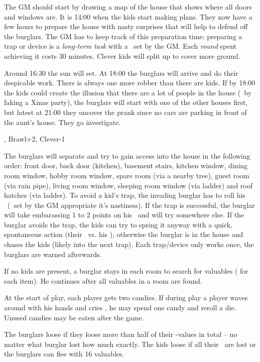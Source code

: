 {	

		\noindent
		The GM should start by drawing a map of the house that shows where all doors and windows are. It is 14:00 when the kids start making plans. They now have a few hours to prepare the house with nasty surprises that will help to defend off the burglars. The GM has to keep track of this preparation time: preparing a trap or device is a \emph{long-term task} with a \TN~set by the GM. Each \emph{round} spent achieving it costs 30 minutes. Clever kids will split up to cover more ground.

		Around 16:30 the sun will set. At 18:00 the burglars will arrive and do their despicable work. There is always one more robber than there are kids. If by 18:00 the kids could create the illusion that there are a lot of people in the house (\eg~by faking a Xmas party), the burglars will start with one of the other houses first, but latest at 21:00 they uncover the prank since no cars are parking in front of the aunt's house. They go investigate.

		, Brawl+2, Clever-1

		The burglars will separate and try to gain access into the house in the following order: front door, back door (kitchen), basement stairs, kitchen window, dining room window, hobby room window, spare room (via a nearby tree), guest room (via rain pipe), living room window, sleeping room window (via ladder) and roof hatches (via ladder). To avoid a kid's trap, the invading burglar has to roll his \RD\ (\TN~set by the GM appropriate it's nastiness). If the trap is successful, the burglar will take embarassing 1 to 2 points on his \HD\ and will try somewhere else. If the burglar avoids the trap, the kids can try to spring it anyway with a quick, spontaneous action (their \AD\ vs. his \RD), otherwise the burglar is in the house and chases the kids (likely into the next trap). Each trap/device only works once, the burglars are warned afterwards.

		If no kids are present, a burglar stays in each room to search for valuables ( for each item). He continues after all valuables in a room are found.


		\noindent
		At the start of play, each player gets two candies. If during play a player waves around with his hands and cries , he may spend one candy and reroll a die. Unused candies may be eaten after the game.


		\noindent
		The burglars loose if they loose more than half of their \HD-values in total -- no matter what burglar lost how much exactly. The kids loose if all their \HD~are lost or the burglars can flee with 16 valuables.
}
